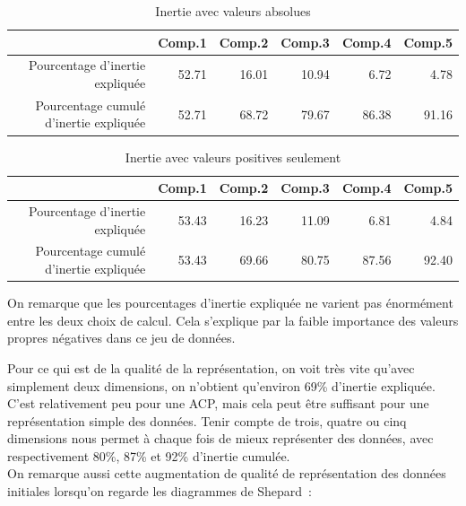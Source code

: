 \documentclass[a4paper,10pt]{report}
\begin{document}
\begin{table}[H]
	\centering
	\begin{tabular}{r|rrrrr}
		& Comp.1 & Comp.2 & Comp.3 & Comp.4 & Comp.5 \\ 
		\hline
		\small Pourcentage d'inertie expliquée & 52.71 & 16.01 & 10.94 & 6.72 & 4.78 \\ 
		\small Pourcentage cumulé d'inertie expliquée & 52.71 & 68.72 & 79.67 & 86.38 & 91.16 \\ 
	\end{tabular}
	\caption{Inertie avec valeurs absolues}
	\label{table:1-mut-acp-aftd-inertie-valeurs-absolues}
\end{table}

\begin{table}[H]
	\centering
	\begin{tabular}{r|rrrrr}
		& Comp.1 & Comp.2 & Comp.3 & Comp.4 & Comp.5 \\ 
		\hline
		\small Pourcentage d'inertie expliquée & 53.43 & 16.23 & 11.09 & 6.81 & 4.84 \\ 
		\small Pourcentage cumulé d'inertie expliquée & 53.43 & 69.66 & 80.75 & 87.56 & 92.40 \\ 
	\end{tabular}
	\caption{Inertie avec valeurs positives seulement}
	\label{table:1-mut-acp-aftd-inertie-valeurs-positives}
\end{table}

On remarque que les pourcentages d'inertie expliquée ne varient pas énormément entre les deux choix de calcul. Cela s'explique par la faible importance des valeurs propres négatives dans ce jeu de données.

Pour ce qui est de la qualité de la représentation, on voit très vite qu'avec simplement deux dimensions, on n'obtient qu'environ 69\% d'inertie expliquée. C'est relativement peu pour une ACP, mais cela peut être suffisant pour une représentation simple des données. Tenir compte de trois, quatre ou cinq dimensions nous permet à chaque fois de mieux représenter des données, avec respectivement 80\%, 87\% et 92\% d'inertie cumulée.\\

On remarque aussi cette augmentation de qualité de représentation des données initiales lorsqu'on regarde les diagrammes de Shepard~:
\end{document}

